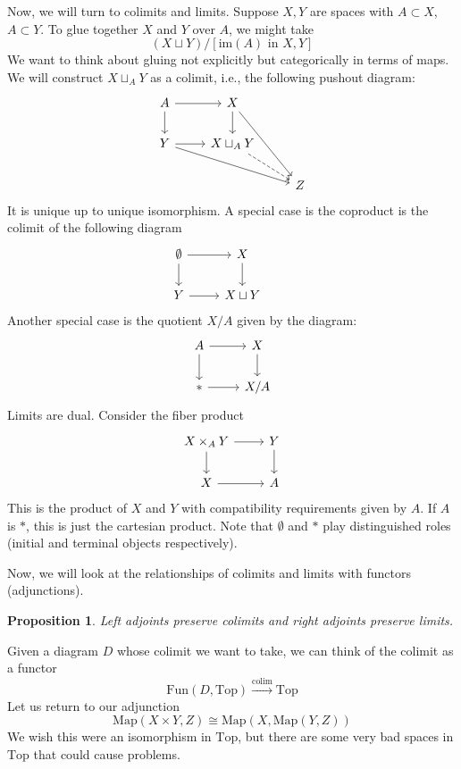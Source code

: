 \documentclass[10pt]{article}
\newtheorem{proposition}[theorem]{Proposition}
\theoremstyle{definition}
\begin{document}
	Now, we will turn to colimits and limits. Suppose $X,Y$ are spaces with $A\subset X$, $A\subset Y$. To glue together $X$ and $Y$ over $A$, we might take 
	$$(X\sqcup Y)/[\text{im}(A)\text{ in }X,Y] $$
	We want to think about gluing not explicitly but categorically in terms of maps. We will construct $X\sqcup_{A}Y$ as a colimit, i.e., the following pushout diagram:
	$$\begin{tikzcd}
	A \arrow[r] \arrow[d]   & X \arrow[d] \arrow[rdd]         &   \\
	Y \arrow[r] \arrow[rrd] & X\sqcup_{A}Y \arrow[rd, dashed] &   \\
	&                                 & Z
	\end{tikzcd}$$
	It is unique up to unique isomorphism. A special case is the coproduct is the colimit of the following diagram
	$$\begin{tikzcd}
	\emptyset \arrow[r] \arrow[d] & X \arrow[d] &   \\
	Y \arrow[r]                   & X\sqcup Y   
	\end{tikzcd}$$
	Another special case is the quotient $X/A$ given by the diagram: 
	$$\begin{tikzcd}
	A \arrow[r] \arrow[d] & X \arrow[d] \\
	* \arrow[r]           & X/A        
	\end{tikzcd}$$
	Limits are dual. Consider the fiber product 
	$$\begin{tikzcd}
	X\times_{A}Y \arrow[r] \arrow[d] & Y \arrow[d] \\
	X \arrow[r]                      & A          
	\end{tikzcd}$$
	This is the product of $X$ and $Y$ with compatibility requirements given by $A$. If $A$ is $*$, this is just the cartesian product. Note that $\emptyset$ and $*$ play distinguished roles (initial and terminal objects respectively).
	
	Now, we will look at the relationships of colimits and limits with functors (adjunctions). 
	\begin{proposition}
		Left adjoints preserve colimits and right adjoints preserve limits. 
	\end{proposition}
	Given a diagram $D$ whose colimit we want to take, we can think of the colimit as a functor 
	$$\text{Fun}(D,\text{Top})\xrightarrow{\text{colim}}\text{Top} $$
	Let us return to our adjunction
	$$\text{Map}(X\times Y,Z)\cong\text{Map}(X,\text{Map}(Y,Z)) $$
	We wish this were an isomorphism in $\text{Top}$, but there are some very bad spaces in $\text{Top}$ that could cause problems. 
	
\end{document}
